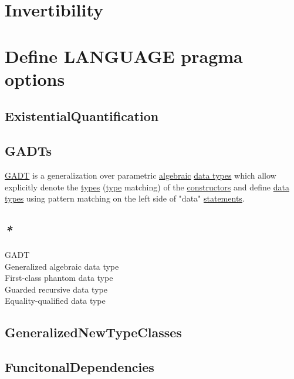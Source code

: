 \documentclass[a4paper,14pt,oneside]{book}
\begin{document}
\chapter{\label{orgad6f8ed}Invertibility}
\label{sec:org6a40ae5}
\chapter{\label{org58caf88}Define LANGUAGE pragma options}
\label{sec:org9b146d2}

\section{\label{orgdaf2daa}ExistentialQuantification}
\label{sec:org6d67c30}

\section{\label{org533dc03}GADTs}
\label{sec:orge985ce0}

\hyperref[org0a5e92f]{GADT} is a generalization over parametric \hyperref[orgb6b24df]{algebraic} \hyperref[orgd636563]{data types} which allow explicitly denote the \hyperref[org47bd1c4]{types} (\hyperref[org35b9249]{type} matching) of the \hyperref[org48436a2]{constructors} and define \hyperref[orgd636563]{data types} using pattern matching on the left side of "data" \hyperref[orga943f4a]{statements}.\\

\section{\emph{*}}
\label{sec:org2d5b007}

\label{org0a5e92f}GADT\\
\label{orgb14d71f}Generalized algebraic data type\\
\label{orgc3167cb}First-class phantom data type\\
\label{orgab371a4}Guarded recursive data type\\
\label{org880ec3d}Equality-qualified data type\\

\section{\label{org1ca5ae4}GeneralizedNewTypeClasses}
\label{sec:org815bfa4}

\section{\label{org26063e7}FuncitonalDependencies}
\label{sec:org4310c81}
\end{document}
